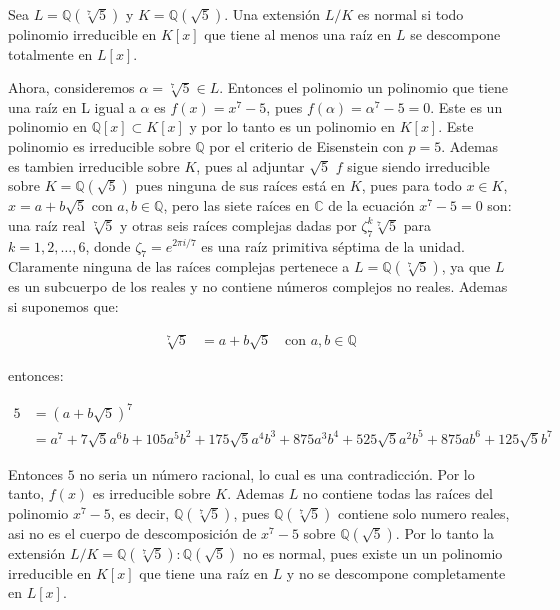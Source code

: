 \begin{solucion}
Sea $L = \mathbb{Q}(\sqrt[7]{5})$ y $K = \mathbb{Q}(\sqrt{5})$. Una extensión $L/K$ es normal si todo polinomio irreducible en $K[x]$ que tiene al menos una raíz en $L$ se descompone totalmente en $L[x]$.

Ahora, consideremos $\alpha = \sqrt[7]{5} \in L$. Entonces el polinomio un polinomio que tiene una raíz en L igual a $\alpha$ es 
$f(x) = x^7 - 5$, pues $f(\alpha) = \alpha^7 - 5 = 0$. Este es un polinomio en $\mathbb{Q}[x] \subset K[x]$ y por lo tanto es un polinomio en $K[x]$. Este polinomio es irreducible sobre $\mathbb{Q}$ por el criterio de Eisenstein con $p=5$. Ademas es tambien irreducible sobre $K$, pues al adjuntar $\sqrt{5}$ $f$ sigue siendo irreducible sobre $K=\mathbb{Q}(\sqrt{5})$ pues ninguna de sus raíces está en $K$, pues para todo $x \in K$, $x = a + b\sqrt{5}$ con $a,b \in \mathbb{Q}$, pero las siete raíces en $\mathbb{C}$ de la ecuación $x^7-5=0$ son: una raíz real $\sqrt[7]{5}$ y otras seis raíces complejas dadas por $\zeta_7^k\sqrt[7]{5}$ para $k=1,2,\dots,6$, donde $\zeta_7 = e^{2\pi i/7}$ es una raíz primitiva séptima de la unidad. Claramente ninguna de las raíces complejas pertenece a $L=\mathbb{Q}(\sqrt[7]{5})$, ya que $L$ es un subcuerpo de los reales y no contiene números complejos no reales. Ademas 
si suponemos que:

\begin{align*}
\sqrt[7]{5} &= a + b\sqrt{5} \quad \text{con } a,b \in \mathbb{Q} 
\end{align*}

entonces:

\begin{align*}
    5 &= (a + b\sqrt{5})^7\\
    &= a^7+7 \sqrt{5} a^6 b+105 a^5 b^2+175 \sqrt{5} a^4 b^3+875 a^3 b^4+525 \sqrt{5} a^2 b^5+875 a b^6+125 \sqrt{5} b^7
\end{align*}

Entonces $5$ no seria un número racional, lo cual es una contradicción. Por lo tanto, $f(x)$ es irreducible sobre $K$. Ademas $L$ no contiene todas las raíces del polinomio $x^7-5$, es decir, $\mathbb{Q}(\sqrt[7]{5})$, pues $\mathbb {Q}(\sqrt[7]{5})$ contiene solo numero reales, asi no es el cuerpo de descomposición de $x^7-5$ sobre $\mathbb{Q}(\sqrt{5})$. Por lo tanto la extensión $L/K = \mathbb{Q}(\sqrt[7]{5}) : \mathbb{Q}(\sqrt{5})$ no es normal, pues existe un un polinomio irreducible en $K[x]$ que tiene una raíz en $L$ y no se descompone completamente en $L[x]$.
\end{solucion}
